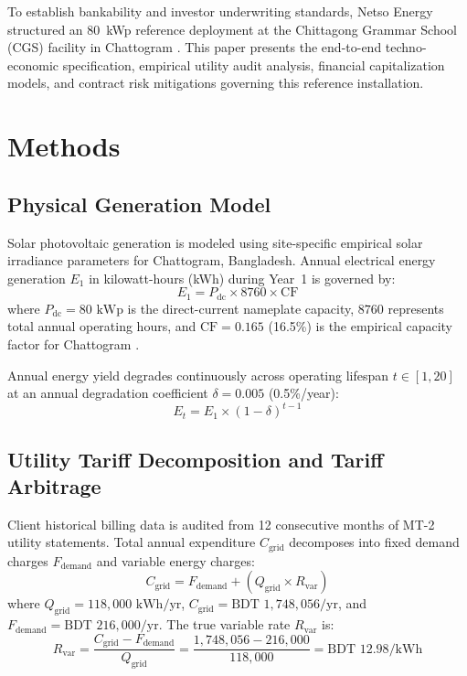 \documentclass[11pt,a4paper]{article}
\begin{document}
To establish bankability and investor underwriting standards, Netso Energy structured an 80~kWp reference deployment at the Chittagong Grammar School (CGS) facility in Chattogram \cite{gt_constants, netso_entity}. This paper presents the end-to-end techno-economic specification, empirical utility audit analysis, financial capitalization models, and contract risk mitigations governing this reference installation.

\section{Methods}
\subsection{Physical Generation Model}
Solar photovoltaic generation is modeled using site-specific empirical solar irradiance parameters for Chattogram, Bangladesh. Annual electrical energy generation $E_1$ in kilowatt-hours (kWh) during Year~1 is governed by:
\begin{equation}
E_1 = P_{\text{dc}} \times 8760 \times \text{CF}
\label{eq:generation}
\end{equation}
where $P_{\text{dc}} = 80\text{ kWp}$ is the direct-current nameplate capacity, $8760$ represents total annual operating hours, and $\text{CF} = 0.165$ (16.5\%) is the empirical capacity factor for Chattogram \cite{gt_constants}.

Annual energy yield degrades continuously across operating lifespan $t \in [1, 20]$ at an annual degradation coefficient $\delta = 0.005$ (0.5\%/year):
\begin{equation}
E_t = E_1 \times (1 - \delta)^{t-1}
\label{eq:degradation}
\end{equation}

\subsection{Utility Tariff Decomposition and Tariff Arbitrage}
Client historical billing data is audited from 12 consecutive months of MT-2 utility statements. Total annual expenditure $C_{\text{grid}}$ decomposes into fixed demand charges $F_{\text{demand}}$ and variable energy charges:
\begin{equation}
C_{\text{grid}} = F_{\text{demand}} + (Q_{\text{grid}} \times R_{\text{var}})
\label{eq:tariff_decomp}
\end{equation}
where $Q_{\text{grid}} = 118{,}000\text{ kWh/yr}$, $C_{\text{grid}} = \text{BDT } 1{,}748{,}056\text{/yr}$, and $F_{\text{demand}} = \text{BDT } 216{,}000\text{/yr}$. The true variable rate $R_{\text{var}}$ is:
\begin{equation}
R_{\text{var}}
  = \frac{C_{\text{grid}} - F_{\text{demand}}}{Q_{\text{grid}}}
  = \frac{1{,}748{,}056 - 216{,}000}{118{,}000}
  = \text{BDT } 12.98\text{/kWh}
\label{eq:true_var}
\end{equation}
\end{document}
